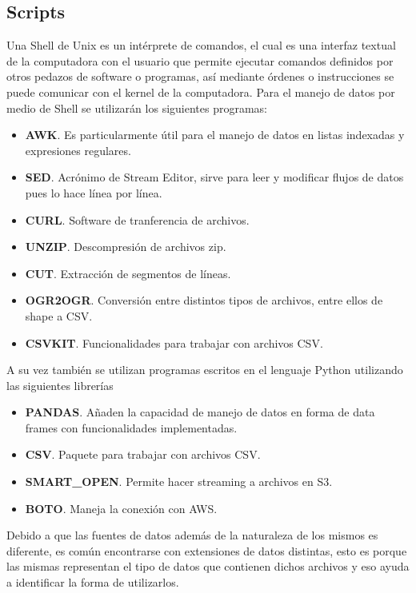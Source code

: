 \subsection{Scripts}
Una Shell de Unix es un intérprete de comandos, el cual es una interfaz textual de la computadora con el usuario que permite ejecutar comandos definidos por otros pedazos de software o programas, así mediante órdenes o instrucciones se puede comunicar con el kernel de la computadora. Para el manejo de datos por medio de Shell se utilizarán los siguientes programas:
\begin{itemize}
    \item \textbf{AWK}. Es particularmente útil para el manejo de datos en listas indexadas y expresiones regulares.
    \item \textbf{SED}. Acrónimo de Stream Editor, sirve para leer y modificar flujos de datos pues lo hace línea por línea.
    \item \textbf{CURL}. Software de tranferencia de archivos.
    \item \textbf{UNZIP}. Descompresión de archivos zip.
    \item \textbf{CUT}. Extracción de segmentos de líneas.
    \item \textbf{OGR2OGR}. Conversión entre distintos tipos de archivos, entre ellos de shape a CSV.
    \item \textbf{CSVKIT}. Funcionalidades para trabajar con archivos CSV.
\end{itemize}
A su vez también se utilizan programas escritos en el lenguaje Python utilizando las siguientes librerías
\begin{itemize}
    \item \textbf{PANDAS}. Añaden la capacidad de manejo de datos en forma de data frames con funcionalidades implementadas.
    \item \textbf{CSV}. Paquete para trabajar con archivos CSV.
    \item \textbf{SMART\_OPEN}. Permite hacer streaming a archivos en S3.
    \item \textbf{BOTO}. Maneja la conexión con AWS.
\end{itemize}
Debido a que las fuentes de datos además de la naturaleza de los mismos es diferente, es común encontrarse con extensiones de datos distintas, esto es porque las mismas representan el tipo de  datos que contienen dichos archivos y eso ayuda a identificar la forma de utilizarlos.
